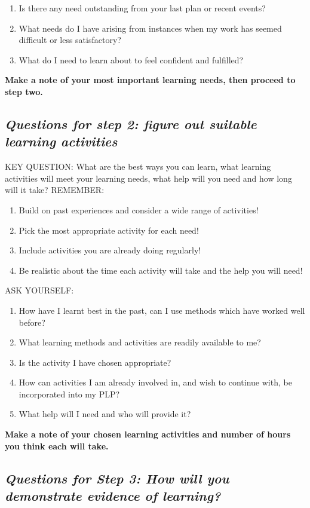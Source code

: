 \begin{enumerate}
\item
  Is there any need outstanding from your last plan or recent events?
\item
  What needs do I have arising from instances when my work has seemed
  difficult or less satisfactory?
\item
  What do I need to learn about to feel confident and fulfilled?
\end{enumerate}
\textbf{Make a note of your most important learning needs, then proceed
to step two.}

\subsection{\emph{Questions for step 2: figure out suitable learning
activities}}

KEY QUESTION: What are the best ways you can learn, what learning
activities will meet your learning needs, what help will you need and
how long will it take? REMEMBER:

\begin{enumerate}
\item
  Build on past experiences and consider a wide range of activities!
\item
  Pick the most appropriate activity for each need!
\item
  Include activities you are already doing regularly!
\item
  Be realistic about the time each activity will take and the help you
  will need!
\end{enumerate}
ASK YOURSELF:

\begin{enumerate}
\item
  How have I learnt best in the past, can I use methods which have
  worked well before?
\item
  What learning methods and activities are readily available to me?
\item
  Is the activity I have chosen appropriate?
\item
  How can activities I am already involved in, and wish to continue
  with, be incorporated into my PLP?
\item
  What help will I need and who will provide it?
\end{enumerate}
\textbf{Make a note of your chosen learning activities and number of
hours you think each will take.}

\subsection{\emph{Questions for Step 3: How will you demonstrate
evidence of learning?}}

